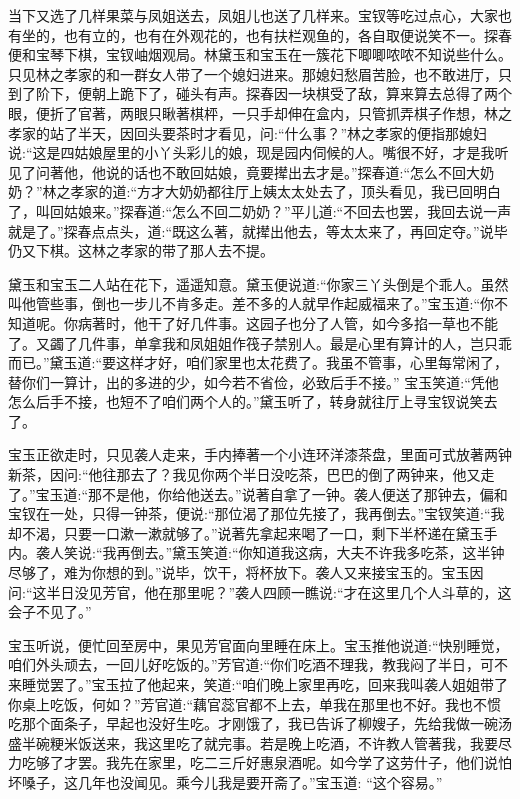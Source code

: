 \begin{parag}
    当下又选了几样果菜与凤姐送去，凤姐儿也送了几样来。宝钗等吃过点心，大家也有坐的，也有立的，也有在外观花的，也有扶栏观鱼的，各自取便说笑不一。探春便和宝琴下棋，宝钗岫烟观局。林黛玉和宝玉在一簇花下唧唧哝哝不知说些什么。只见林之孝家的和一群女人带了一个媳妇进来。那媳妇愁眉苦脸，也不敢进厅，只到了阶下，便朝上跪下了，碰头有声。探春因一块棋受了敌，算来算去总得了两个眼，便折了官著，两眼只瞅著棋枰，一只手却伸在盒内，只管抓弄棋子作想，林之孝家的站了半天，因回头要茶时才看见，问:“什么事？”林之孝家的便指那媳妇说:“这是四姑娘屋里的小丫头彩儿的娘，现是园内伺候的人。嘴很不好，才是我听见了问著他，他说的话也不敢回姑娘，竟要撵出去才是。”探春道:“怎么不回大奶奶？”林之孝家的道:“方才大奶奶都往厅上姨太太处去了，顶头看见，我已回明白了，叫回姑娘来。”探春道:“怎么不回二奶奶？”平儿道:“不回去也罢，我回去说一声就是了。”探春点点头，道:“既这么著，就撵出他去，等太太来了，再回定夺。”说毕仍又下棋。这林之孝家的带了那人去不提。
\end{parag}


\begin{parag}
    黛玉和宝玉二人站在花下，遥遥知意。黛玉便说道:“你家三丫头倒是个乖人。虽然叫他管些事，倒也一步儿不肯多走。差不多的人就早作起威福来了。”宝玉道:“你不知道呢。你病著时，他干了好几件事。这园子也分了人管，如今多掐一草也不能了。又蠲了几件事，单拿我和凤姐姐作筏子禁别人。最是心里有算计的人，岂只乖而已。”黛玉道:“要这样才好，咱们家里也太花费了。我虽不管事，心里每常闲了，替你们一算计，出的多进的少，如今若不省俭，必致后手不接。” 宝玉笑道:“凭他怎么后手不接，也短不了咱们两个人的。”黛玉听了，转身就往厅上寻宝钗说笑去了。
\end{parag}


\begin{parag}
    宝玉正欲走时，只见袭人走来，手内捧著一个小连环洋漆茶盘，里面可式放著两钟新茶，因问:“他往那去了？我见你两个半日没吃茶，巴巴的倒了两钟来，他又走了。”宝玉道:“那不是他，你给他送去。”说著自拿了一钟。袭人便送了那钟去，偏和宝钗在一处，只得一钟茶，便说:“那位渴了那位先接了，我再倒去。”宝钗笑道:“我却不渴，只要一口漱一漱就够了。”说著先拿起来喝了一口，剩下半杯递在黛玉手内。袭人笑说:“我再倒去。”黛玉笑道:“你知道我这病，大夫不许我多吃茶，这半钟尽够了，难为你想的到。”说毕，饮干，将杯放下。袭人又来接宝玉的。宝玉因问:“这半日没见芳官，他在那里呢？”袭人四顾一瞧说:“才在这里几个人斗草的，这会子不见了。”
\end{parag}


\begin{parag}
    宝玉听说，便忙回至房中，果见芳官面向里睡在床上。宝玉推他说道:“快别睡觉，咱们外头顽去，一回儿好吃饭的。”芳官道:“你们吃酒不理我，教我闷了半日，可不来睡觉罢了。”宝玉拉了他起来，笑道:“咱们晚上家里再吃，回来我叫袭人姐姐带了你桌上吃饭，何如？”芳官道:“藕官蕊官都不上去，单我在那里也不好。我也不惯吃那个面条子，早起也没好生吃。才刚饿了，我已告诉了柳嫂子，先给我做一碗汤盛半碗粳米饭送来，我这里吃了就完事。若是晚上吃酒，不许教人管著我，我要尽力吃够了才罢。我先在家里，吃二三斤好惠泉酒呢。如今学了这劳什子，他们说怕坏嗓子，这几年也没闻见。乘今儿我是要开斋了。”宝玉道: “这个容易。”
\end{parag}


